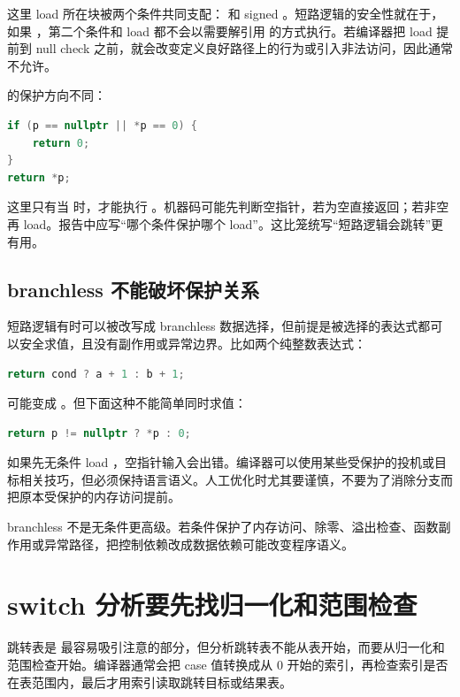 这里 load 所在块被两个条件共同支配： 和 signed 。短路逻辑的安全性就在于，如果 ，第二个条件和 load 都不会以需要解引用  的方式执行。若编译器把 load 提前到 null check 之前，就会改变定义良好路径上的行为或引入非法访问，因此通常不允许。

\code{||} 的保护方向不同：

\begin{lstlisting}[language=C++]
if (p == nullptr || *p == 0) {
    return 0;
}
return *p;
\end{lstlisting}

这里只有当  时，才能执行 。机器码可能先判断空指针，若为空直接返回；若非空再 load。报告中应写“哪个条件保护哪个 load”。这比笼统写“短路逻辑会跳转”更有用。

\subsection{branchless 不能破坏保护关系}

短路逻辑有时可以被改写成 branchless 数据选择，但前提是被选择的表达式都可以安全求值，且没有副作用或异常边界。比如两个纯整数表达式：

\begin{lstlisting}[language=C++]
return cond ? a + 1 : b + 1;
\end{lstlisting}

可能变成 。但下面这种不能简单同时求值：

\begin{lstlisting}[language=C++]
return p != nullptr ? *p : 0;
\end{lstlisting}

如果先无条件 load ，空指针输入会出错。编译器可以使用某些受保护的投机或目标相关技巧，但必须保持语言语义。人工优化时尤其要谨慎，不要为了消除分支而把原本受保护的内存访问提前。

\begin{warningbox}
branchless 不是无条件更高级。若条件保护了内存访问、除零、溢出检查、函数副作用或异常路径，把控制依赖改成数据依赖可能改变程序语义。
\end{warningbox}

\section{switch 分析要先找归一化和范围检查}

跳转表是  最容易吸引注意的部分，但分析跳转表不能从表开始，而要从归一化和范围检查开始。编译器通常会把 case 值转换成从 0 开始的索引，再检查索引是否在表范围内，最后才用索引读取跳转目标或结果表。

